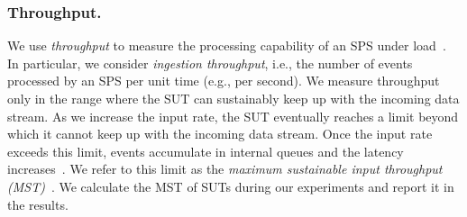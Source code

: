 \documentclass[runningheads]{llncs}
\begin{document}
\subsubsection{Throughput.}


We use \textit{throughput} to measure the processing capability of an SPS under load~\cite{sps_survey_2024}.
In particular, we consider \textit{ingestion throughput}, i.e., the number of events processed by an SPS per unit time (e.g., per second).
We measure throughput only in the range where the SUT can sustainably keep up with the incoming data stream.
As we increase the input rate, the SUT eventually reaches a limit beyond which it cannot keep up with the incoming data stream.
Once the input rate exceeds this limit, events accumulate in internal queues and the latency increases~\cite{perf-eval-iot}.
We refer to this limit as the \textit{maximum sustainable input throughput (MST)}~\cite{maximum-throughput,karimov2018}.%
We calculate the MST of SUTs during our experiments and report it in the results.
\end{document}
